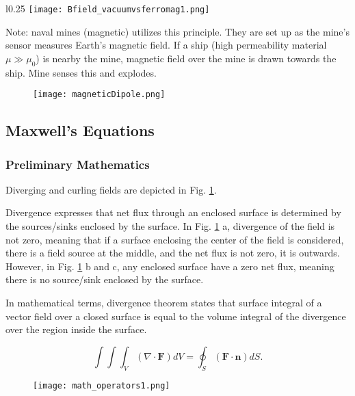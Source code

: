 \begin{wrapfigure}{l}{0.25\textwidth}
    \centering
    \texttt{[image: Bfield\_vacuumvsferromag1.png]}
\end{wrapfigure}

Note: naval mines (magnetic) utilizes this principle. They are set up as the mine's sensor measures Earth's magnetic field. If a ship (high permeability material $\mu \gg \mu_{0}$) is nearby the mine, magnetic field over the mine is drawn towards the ship. Mine senses this and explodes.



\begin{figure}[h]
    \centering
    \texttt{[image: magneticDipole.png]}
\end{figure}


\subsection{Maxwell's Equations}

\subsubsection{Preliminary Mathematics}

Diverging and curling fields are depicted in Fig. \ref{fig:divcurl}. 


Divergence expresses that net flux through an enclosed surface is determined by the sources/sinks enclosed by the surface. In Fig. \ref{fig:divcurl} a, divergence of the field is not zero, meaning that if a surface enclosing the center of the field is considered, there is a field source at the middle, and the net flux is not zero, it is outwards. However, in Fig. \ref{fig:divcurl} b and c, any enclosed surface have a zero net flux, meaning there is no source/sink enclosed by the surface.

In mathematical terms, divergence theorem states that surface integral of a vector field over a closed surface is equal to the volume integral of the divergence over the region inside the surface.

\begin{equation}
	\int \int \int_{V} (\nabla \cdot \mathbf{F})dV = \oint_{S} (\mathbf{F} \cdot \mathbf{n})dS.
\end{equation}

\begin{figure}[h]
    \centering
    \texttt{[image: math\_operators1.png]}
    \label{fig:divcurl}
\end{figure}



